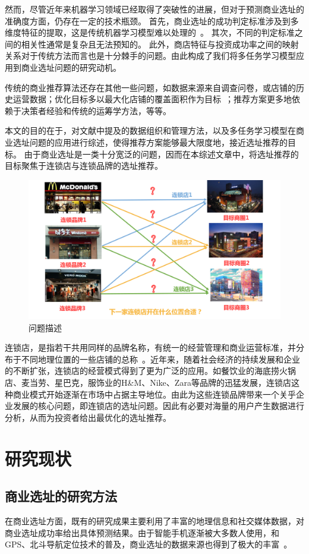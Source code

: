 \documentclass{llncs}
\begin{document}
然而，尽管近年来机器学习领域已经取得了突破性的进展，但对于预测商业选址的准确度方面，仍存在一定的技术瓶颈。
首先，商业选址的成功判定标准涉及到多维度特征的提取，这是传统机器学习模型难以处理的~\cite{ZhouLiuCai}。
其次，不同的判定标准之间的相关性通常是复杂且无法预知的。
此外，商店特征与投资成功率之间的映射关系对于传统方法而言也是十分棘手的问题。由此构成了我们将多任务学习模型应用到商业选址问题的研究动机。

传统的商业推荐算法还存在其他一些问题，如数据来源来自调查问卷，或店铺的历史运营数据；优化目标多以最大化店铺的覆盖面积作为目标~\cite{jou2016deep}；推荐方案更多地依赖于决策者经验和传统的运筹学方法，等等。

本文的目的在于，对文献中提及的数据组织和管理方法，以及多任务学习模型在商业选址问题的应用进行综述，使得推荐方案能够最大限度地，接近选址推荐的目标。
由于商业选址是一类十分宽泛的问题，因而在本综述文章中，将选址推荐的目标聚焦于连锁店与连锁品牌的选址推荐。
\begin{figure}
	\centering
	\includegraphics[width=0.8\columnwidth]{figures/intro.png}
	\caption{问题描述}
	\label{intro}
\end{figure}

连锁店，是指若干共用同样的品牌名称，有统一的经营管理和商业运营标准，并分布于不同地理位置的一些店铺的总称~\cite{DongHongAn}。近年来，随着社会经济的持续发展和企业的不断扩张，连锁店的经营模式得到了更为广泛的应用。如餐饮业的海底捞火锅店、麦当劳、星巴克，服饰业的H\&M、Nike、Zara等品牌的迅猛发展，连锁店这种商业模式开始逐渐在市场中占据主导地位。由此为这些连锁品牌带来一个关乎企业发展的核心问题，即连锁店的选址问题。因此有必要对海量的用户产生数据进行分析，从而为投资者给出最优化的选址推荐。


\section{研究现状}
\subsection{商业选址的研究方法}
在商业选址方面，既有的研究成果主要利用了丰富的地理信息和社交媒体数据，对商业选址成功率给出具体预测结果。由于智能手机逐渐被大多数人使用，和GPS、北斗导航定位技术的普及，商业选址的数据来源也得到了极大的丰富~\cite{zhao2017mining,chen2017mining}。
\end{document}

